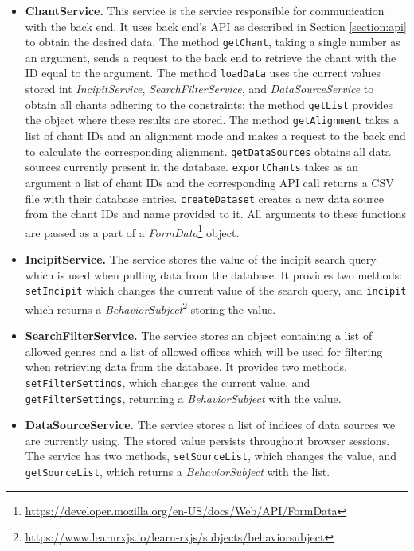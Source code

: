 \begin{itemize}

\item\textbf{ChantService.} This service is the service responsible for communication with the back end. It uses back end's API as described in Section \ref{section:api} to
obtain the desired data. The method \verb|getChant|, taking a single number as an argument, sends a request to the back end to retrieve the chant with 
the ID equal to the argument. The method \verb|loadData| uses the current values stored int \emph{IncipitService}, \emph{SearchFilterService}, and
\emph{DataSourceService} to obtain all chants adhering to the constraints; the method \verb|getList| provides the object where these results are stored.
The method \verb|getAlignment| takes a list of chant IDs and an alignment mode and makes a request to the back end to calculate the corresponding alignment.
\verb|getDataSources| obtains all data sources currently present in the database. \verb|exportChants| takes as an argument a list of chant IDs and the 
corresponding API call returns a CSV file with their database entries. \verb|createDataset| creates a new data source from the chant IDs and name provided
to it. All arguments to these functions are passed as a part of a \emph{FormData}\footnote{\url{https://developer.mozilla.org/en-US/docs/Web/API/FormData}}
object.

\item\textbf{IncipitService.} The service stores the value of the incipit search query which is used when pulling data from the database. It provides two methods:
\verb|setIncipit| which changes the current value of the search query, and \verb|incipit| which returns a \emph{BehaviorSubject}\footnote{\url{https://www.learnrxjs.io/learn-rxjs/subjects/behaviorsubject}}
storing the value.

\item\textbf{SearchFilterService.} The service stores an object containing a list of allowed genres and a list of allowed offices which will be used for filtering
when retrieving data from the database. It provides two methods, \verb|setFilterSettings|, which changes the current value, and \verb|getFilter|\verb|Settings|, returning
a \emph{BehaviorSubject} with the value.

\item\textbf{DataSourceService.} The service stores a list of indices of data sources we are currently using. The stored value persists throughout browser sessions.
The service has two methods, \verb|setSourceList|, which changes the value, and \verb|getSourceList|, which returns a \emph{BehaviorSubject} with the list.


\end{itemize}
